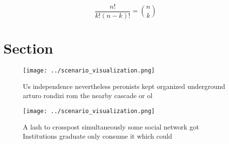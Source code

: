 \documentclass[a4paper]{article}
\begin{document}
\[ \frac{n!}{k!(n-k)!} = \binom{n}{k} \]

\section{Section}

\begin{figure}
\centering
\texttt{[image: ../scenario\_visualization.png]}
\caption{Us independence nevertheless peronists kept organized underground arturo rondizi rom the nearby cascade or ol
}
\end{figure}
 
\begin{figure}
\centering
\texttt{[image: ../scenario\_visualization.png]}
\caption{A lash to crosspost simultaneously some social network got Institutions graduate only consume it which could 
}
\end{figure}
 
\end{document}
